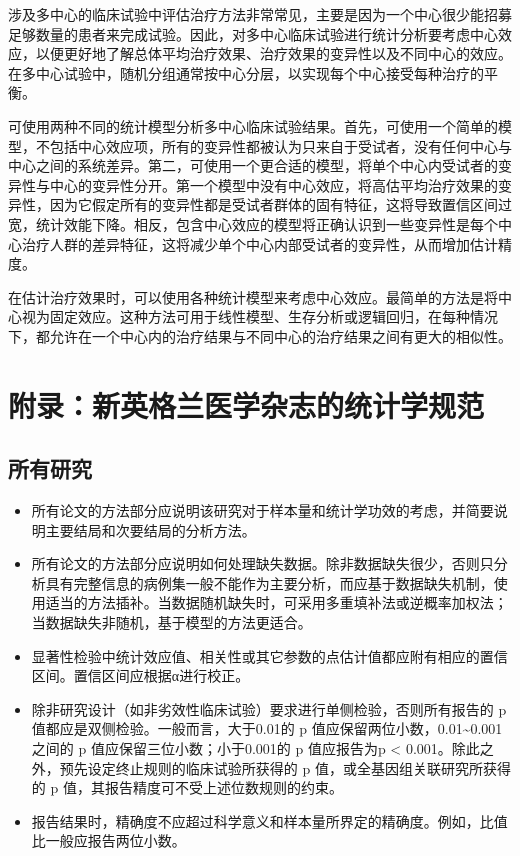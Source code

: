 \documentclass[
  chinese-hans,
  letterpaper,
  DIV=11,
  numbers=noendperiod]{scrreprt}
\begin{document}
涉及多中心的临床试验中评估治疗方法非常常见，主要是因为一个中心很少能招募足够数量的患者来完成试验。因此，对多中心临床试验进行统计分析要考虑中心效应，以便更好地了解总体平均治疗效果、治疗效果的变异性以及不同中心的效应。在多中心试验中，随机分组通常按中心分层，以实现每个中心接受每种治疗的平衡。

可使用两种不同的统计模型分析多中心临床试验结果。首先，可使用一个简单的模型，不包括中心效应项，所有的变异性都被认为只来自于受试者，没有任何中心与中心之间的系统差异。第二，可使用一个更合适的模型，将单个中心内受试者的变异性与中心的变异性分开。第一个模型中没有中心效应，将高估平均治疗效果的变异性，因为它假定所有的变异性都是受试者群体的固有特征，这将导致置信区间过宽，统计效能下降。相反，包含中心效应的模型将正确认识到一些变异性是每个中心治疗人群的差异特征，这将减少单个中心内部受试者的变异性，从而增加估计精度。

在估计治疗效果时，可以使用各种统计模型来考虑中心效应。最简单的方法是将中心视为固定效应。这种方法可用于线性模型、生存分析或逻辑回归，在每种情况下，都允许在一个中心内的治疗结果与不同中心的治疗结果之间有更大的相似性。

\section{附录：新英格兰医学杂志的统计学规范}\label{ux9644ux5f55ux65b0ux82f1ux683cux5170ux533bux5b66ux6742ux5fd7ux7684ux7edfux8ba1ux5b66ux89c4ux8303}

\subsection{所有研究}\label{ux6240ux6709ux7814ux7a76}

\begin{itemize}
\item
  所有论文的方法部分应说明该研究对于样本量和统计学功效的考虑，并简要说明主要结局和次要结局的分析方法。
\item
  所有论文的方法部分应说明如何处理缺失数据。除非数据缺失很少，否则只分析具有完整信息的病例集一般不能作为主要分析，而应基于数据缺失机制，使用适当的方法插补。当数据随机缺失时，可采用多重填补法或逆概率加权法；当数据缺失非随机，基于模型的方法更适合。
\item
  显著性检验中统计效应值、相关性或其它参数的点估计值都应附有相应的置信区间。置信区间应根据α进行校正。
\item
  除非研究设计（如非劣效性临床试验）要求进行单侧检验，否则所有报告的 p
  值都应是双侧检验。一般而言，大于0.01的 p
  值应保留两位小数，0.01\textasciitilde0.001之间的 p
  值应保留三位小数；小于0.001的 p 值应报告为p \textless{}
  0.001。除此之外，预先设定终止规则的临床试验所获得的 p
  值，或全基因组关联研究所获得的 p
  值，其报告精度可不受上述位数规则的约束。
\item
  报告结果时，精确度不应超过科学意义和样本量所界定的精确度。例如，比值比一般应报告两位小数。
\end{itemize}
\end{document}
